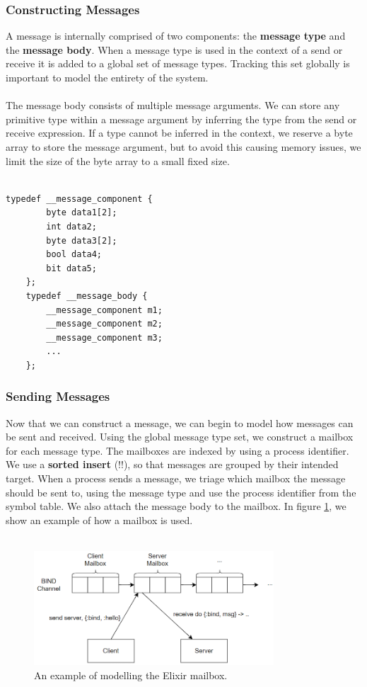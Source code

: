\subsubsection{Constructing Messages}
A message is internally comprised of two components: the \textbf{message type} and the \textbf{message body}. When a message type is used in the context of a send or receive it is added to a global set of message types. Tracking this set globally is important to model the entirety of the system. 
\\ \\
The message body consists of multiple message arguments. We can store any primitive type within a message argument by inferring the type from the send or receive expression. If a type cannot be inferred in the context, we reserve a byte array to store the message argument, but to avoid this causing memory issues, we limit the size of the byte array to a small fixed size.
\\ \\
\begin{lstlisting}[language=Promela, caption={Example of a message body, from the Verlixir Promela library.}]
    typedef __message_component {
        byte data1[2];
        int data2;
        byte data3[2];
        bool data4;
        bit data5;
    };
    typedef __message_body {
        __message_component m1;
        __message_component m2;
        __message_component m3;
        ...
    };
\end{lstlisting}
\subsubsection{Sending Messages}
Now that we can construct a message, we can begin to model how messages can be sent and received. Using the global message type set, we construct a mailbox for each message type. The mailboxes are indexed by using a process identifier. We use a \textbf{sorted insert} (!!), so that messages are grouped by their intended target. When a process sends a message, we triage which mailbox the message should be sent to, using the message type and use the process identifier from the symbol table. We also attach the message body to the mailbox. In figure \ref{fig:promela_mailbox}, we show an example of how a mailbox is used.
\\ \\
\begin{figure}[h]
    \centering
    \includegraphics[width=0.8\textwidth]{images/promela_messages.png}
    \caption{An example of modelling the Elixir mailbox.}
    \label{fig:promela_mailbox}
\end{figure}
\\ \\
